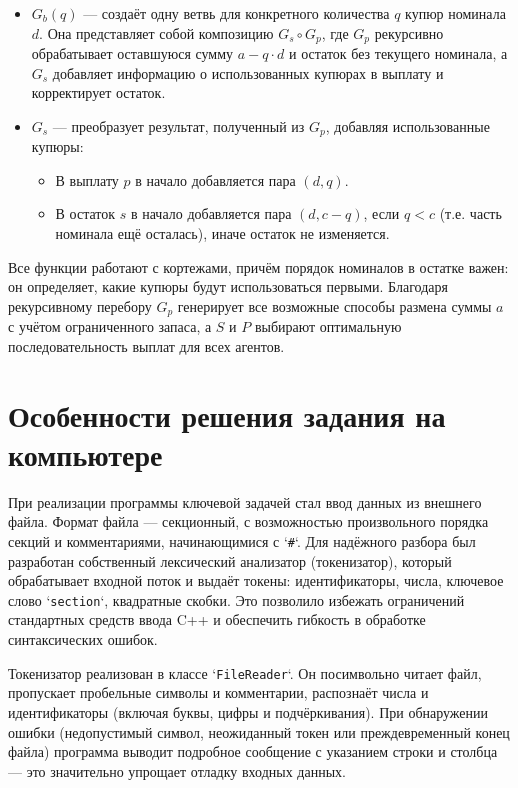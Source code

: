 \documentclass[12pt]{extarticle}
\begin{document}
\begin{itemize}
\begin{itemize}
    \end{itemize}
  \item $G_b(q)$ — создаёт одну ветвь для конкретного количества $q$ купюр номинала $d$. Она представляет собой композицию $G_s \circ G_p$, где $G_p$ рекурсивно обрабатывает оставшуюся сумму $a - q \cdot d$ и остаток без текущего номинала, а $G_s$ добавляет информацию о использованных купюрах в выплату и корректирует остаток.
  \item $G_s$ — преобразует результат, полученный из $G_p$, добавляя использованные купюры:
    \begin{itemize}
      \item В выплату $p$ в начало добавляется пара $(d, q)$.
      \item В остаток $s$ в начало добавляется пара $(d, c - q)$, если $q < c$ (т.е. часть номинала ещё осталась), иначе остаток не изменяется.
    \end{itemize}
\end{itemize}

Все функции работают с кортежами, причём порядок номиналов в остатке важен: он определяет, какие купюры будут использоваться первыми. Благодаря рекурсивному перебору $G_p$ генерирует все возможные способы размена суммы $a$ с учётом ограниченного запаса, а $S$ и $P$ выбирают оптимальную последовательность выплат для всех агентов.

\section{Особенности решения задания на компьютере}

При реализации программы ключевой задачей стал ввод данных из внешнего файла. Формат файла — секционный, с возможностью произвольного порядка секций и комментариями, начинающимися с `\texttt{\#}`. Для надёжного разбора был разработан собственный лексический анализатор (токенизатор), который обрабатывает входной поток и выдаёт токены: идентификаторы, числа, ключевое слово `\texttt{section}`, квадратные скобки. Это позволило избежать ограничений стандартных средств ввода C++ и обеспечить гибкость в обработке синтаксических ошибок.

Токенизатор реализован в классе `\texttt{FileReader}`. Он посимвольно читает файл, пропускает пробельные символы и комментарии, распознаёт числа и идентификаторы (включая буквы, цифры и подчёркивания). При обнаружении ошибки (недопустимый символ, неожиданный токен или преждевременный конец файла) программа выводит подробное сообщение с указанием строки и столбца — это значительно упрощает отладку входных данных.
\end{document}
